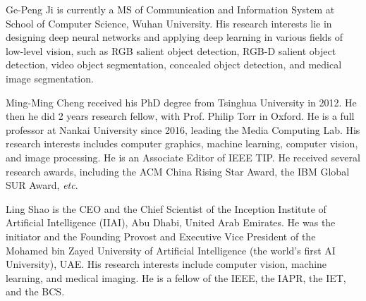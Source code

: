 \documentclass[10pt,journal,compsoc]{IEEEtran}
\def\etc{\emph{etc}}
\begin{document}
\begin{IEEEbiography}
{Ge-Peng Ji} is currently a MS of Communication and Information System at School of Computer Science, Wuhan University. His research interests lie in designing deep neural networks and applying deep learning in various fields of low-level vision, such as RGB salient object detection, RGB-D salient object detection, video object segmentation, concealed object detection, and medical image segmentation.
\end{IEEEbiography}
\vspace{-.5in}

\begin{IEEEbiography}
{Ming-Ming Cheng} received his PhD degree from Tsinghua University in 2012. 
He then he did 2 years research fellow, with Prof. Philip Torr in Oxford. 
He is a full professor at Nankai University since 2016,
leading the Media Computing Lab. 
His research interests includes computer graphics, machine learning, 
computer vision, and image processing. 
He is an Associate Editor of IEEE TIP. 
He received several research awards, including the ACM China Rising Star Award, 
the IBM Global SUR Award, \etc.
\end{IEEEbiography}
\vspace{-.5in}

\begin{IEEEbiography}
{Ling Shao} is the CEO and the Chief Scientist of the Inception Institute of Artificial Intelligence (IIAI), Abu Dhabi, United Arab Emirates. He was the initiator and the Founding Provost and Executive Vice President of the Mohamed bin Zayed University of Artificial Intelligence (the world's first AI University), UAE. His research interests include computer vision, machine learning, and medical imaging. He is a fellow of the IEEE, the IAPR, the IET, and the BCS. 
\end{IEEEbiography}
\end{document}
